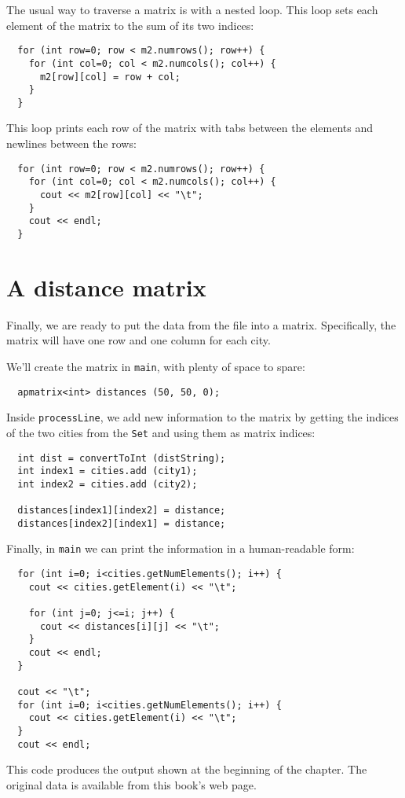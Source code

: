 
The usual way to traverse a matrix is with a nested loop.
This loop sets each element of the matrix to the sum of its
two indices:

\begin{verbatim}
  for (int row=0; row < m2.numrows(); row++) {
    for (int col=0; col < m2.numcols(); col++) {
      m2[row][col] = row + col;
    }
  }
\end{verbatim}
%
This loop prints each row of the matrix with tabs between the
elements and newlines between the rows:

\begin{verbatim}
  for (int row=0; row < m2.numrows(); row++) {
    for (int col=0; col < m2.numcols(); col++) {
      cout << m2[row][col] << "\t";
    }
    cout << endl;
  }
\end{verbatim}
%

\section{A distance matrix}

Finally, we are ready to put the data from the file into
a matrix.  Specifically, the matrix will have one row and
one column for each city.

We'll create the matrix in {\tt main}, with plenty of space
to spare:

\begin{verbatim}
  apmatrix<int> distances (50, 50, 0);
\end{verbatim}
%

Inside {\tt processLine}, we add new information to the
matrix by getting the indices of the two cities from the
{\tt Set} and using them as matrix indices:

\begin{verbatim}
  int dist = convertToInt (distString);
  int index1 = cities.add (city1);
  int index2 = cities.add (city2);

  distances[index1][index2] = distance;
  distances[index2][index1] = distance;
\end{verbatim}
%
Finally, in {\tt main} we can print the information in a
human-readable form:

\begin{verbatim}
  for (int i=0; i<cities.getNumElements(); i++) {
    cout << cities.getElement(i) << "\t";

    for (int j=0; j<=i; j++) {
      cout << distances[i][j] << "\t";
    }
    cout << endl;
  }

  cout << "\t";
  for (int i=0; i<cities.getNumElements(); i++) {
    cout << cities.getElement(i) << "\t";
  }
  cout << endl;
\end{verbatim}
%
This code produces the output shown at the beginning of the
chapter.  The original data is available from this book's web page.

